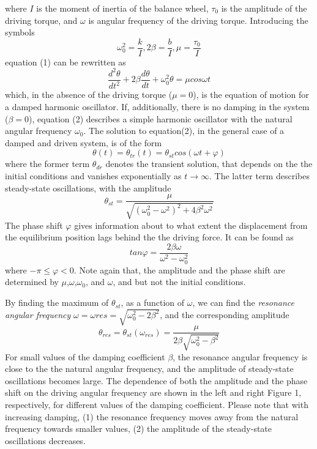 \documentclass[12pt]{article}
\begin{document}
where $I$ is the moment of inertia of the balance wheel, $\tau_0$ is the amplitude of the driving torque, and $\omega$ is angular frequency of the driving torque. Introducing the symbols
$$\omega_0^2=\frac{k}{I},2\beta=\frac{b}{I},\mu=\frac{\tau_0}{I}$$
equation (1) can be rewritten as
\begin{equation}
\frac{d^2\theta}{dt^2}+2\beta\frac{d\theta}{dt}+\omega_0^2\theta=\mu cos\omega t
\end{equation}
which, in the absence of the driving torque ($\mu=0$), is the equation of motion for a
damped harmonic oscillator. If, additionally, there is no damping in the system ($\beta=0$), equation (2) describes a simple harmonic oscillator with the natural angular frequency $\omega_0$. The solution to equation(2), in the general case of a damped and driven system, is of the form
\begin{equation}
\theta(t)=\theta_{tr}(t)=\theta_{st}cos(\omega t +\varphi)
\end{equation}
where the former term $\theta_{dr}$ denotes the transient solution, that depends on the the initial conditions and vanishes exponentially as $t\to\infty$. The latter term describes steady-state oscillations, with the amplitude
\begin{equation}
\theta_{st}=\frac{\mu}{\sqrt{(\omega_0^2-\omega^2)^2+4\beta^2\omega^2}}
\end{equation}
The phase shift $\varphi$ gives information about to what extent the displacement from the equilibrium position lags behind the the driving force. It can be found as
$$tan\varphi=\frac{2\beta\omega}{\omega^2-\omega_0^2}$$
where $-\pi\leqslant\varphi<0$. Note again that, the amplitude and the phase shift are determined by $\mu$,$\omega$,$\omega_0$, and $\omega$, and but not the initial conditions.
\par By finding the maximum of $\theta_{st}$, as a function of $\omega$, we can find the \emph{resonance angular
frequency} $\omega=\omega{res}=\sqrt{\omega_0^2-2\beta^2}$, and the corresponding amplitude
$$\theta_{res}=\theta_{st}(\omega_{res})=\frac{\mu}{2\beta\sqrt{\omega_0^2-\beta^2}}$$
For small values of the damping coefficient $\beta$, the resonance angular frequency is close to the the natural angular frequency, and the amplitude of steady-state oscillations becomes large. The dependence of both the amplitude and the phase shift on the driving angular frequency are shown in the left and right Figure 1, respectively, for different values of the damping coefficient. Please note that with increasing damping, (1) the resonance frequency moves away from the natural frequency towards smaller values, (2) the amplitude of the steady-state oscillations decreases.
\end{document}
